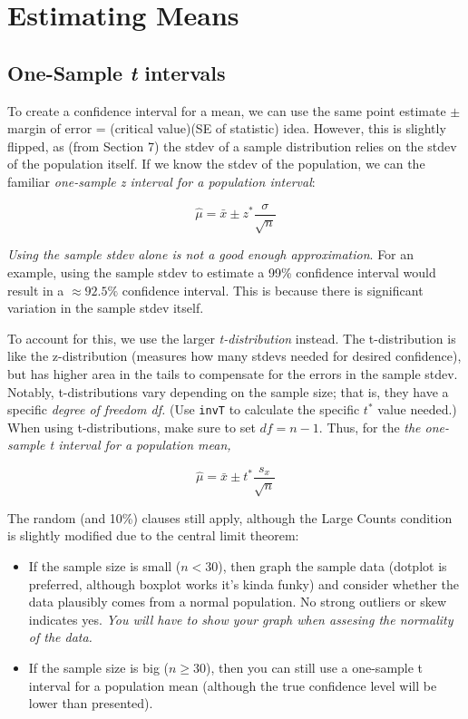 \documentclass[12pt, a4paper]{article}
\theoremstyle{definition}
\begin{document}
\section{Estimating Means}

\subsection{One-Sample \textit{t} intervals}

To create a confidence interval for a mean, we can use the same point estimate $\pm$ margin of error = (critical value)(SE of statistic) idea.
However, this is slightly flipped, as (from Section 7) the stdev of a sample distribution relies on the stdev of the population itself.
If we know the stdev of the population, we can the familiar \textit{one-sample z interval for a population interval}:

\[\hat{\mu} = \bar{x} \pm z^{*}\frac{\sigma}{\sqrt{n}}\]

\textit{Using the sample stdev alone is not a good enough approximation}.
For an example, using the sample stdev to estimate a 99\% confidence interval would result in a $\approx 92.5\%$ confidence interval.
This is because there is significant variation in the sample stdev itself.

To account for this, we use the larger \textit{t-distribution} instead.
The t-distribution is like the z-distribution (measures how many stdevs needed for desired confidence), but has higher area in the tails to compensate for the errors in the sample stdev.
Notably, t-distributions vary depending on the sample size; that is, they have a specific \textit{degree of freedom df.}
(Use \verb|invT| to calculate the specific $t^{*}$ value needed.)
When using t-distributions, make sure to set $df = n - 1$. Thus, for the \textit{the one-sample t interval for a population mean,}

\[\hat{\mu} = \bar{x} \pm t^{*}\frac{s_x}{\sqrt{n}}\]

The random (and 10\%) clauses still apply, although the Large Counts condition is slightly modified due to the central limit theorem:
\begin{itemize}
    \item If the sample size is small ($n < 30$), then graph the sample data (dotplot is preferred, although boxplot works it's kinda funky) and consider whether the data plausibly comes from a normal population.
    No strong outliers or skew indicates yes. \textit{You will have to show your graph when assesing the normality of the data.}
    \item If the sample size is big ($n \geq 30$), then you can still use a one-sample t interval for a population mean (although the true confidence level will be lower than presented).
\end{itemize}
\end{document}
